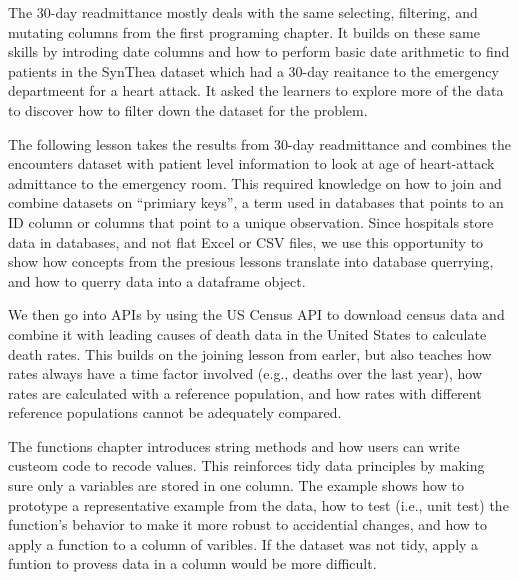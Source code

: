 \documentclass[030-workshop.tex]{subfiles}
\begin{document}
            The 30-day readmittance mostly deals with the same selecting, filtering, and mutating columns
            from the first programing chapter.
            It builds on these same skills by introding date columns and how to perform basic date arithmetic
            to find patients in the SynThea dataset which had a 30-day reaitance to the emergency departmeent for a heart attack.
            It asked the learners to explore more of the data to discover how to filter down the dataset for the problem.

            The following lesson takes the results from 30-day readmittance and combines the encounters dataset with
            patient level information to look at age of heart-attack admittance to the emergency room.
            This required knowledge on how to join and combine datasets on ``primiary keys'',
            a term used in databases that points to an ID column or columns that point to a unique observation.
            Since hospitals store data in databases, and not flat Excel or CSV files,
            we use this opportunity to show how concepts from the presious lessons translate into database querrying,
            and how to querry data into a dataframe object.

            We then go into APIs by using the US Census API to download census data and combine it with
            leading causes of death data in the United States to calculate death rates.
            This builds on the joining lesson from earler,
            but also teaches how rates always have a time factor involved (e.g., deaths over the last year),
            how rates are calculated with a reference population,
            and how rates with different reference populations cannot be adequately compared.

            The functions chapter introduces string methods and how users can write custeom code to
            recode values.
            This reinforces tidy data principles by making sure only a variables are stored in one column.
            The example shows how to prototype a representative example from the data,
            how to test (i.e., unit test) the function's behavior to make it more robust to accidential changes,
            and how to apply a function to a column of varibles.
            If the dataset was not tidy,
            apply a funtion to provess data in a column would be more difficult.
\end{document}
